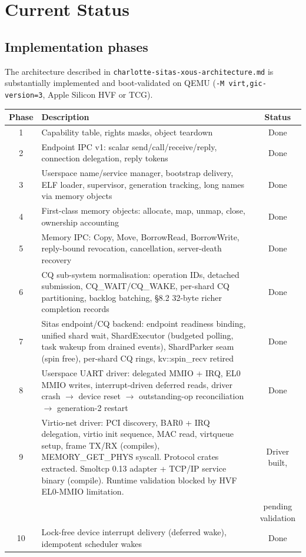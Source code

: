 \chapter{Current Status}

\section{Implementation phases}

The architecture described in \texttt{charlotte-sitas-xous-architecture.md} is
substantially implemented and boot-validated on QEMU (\texttt{-M
virt,gic-version=3}, Apple Silicon HVF or TCG).

\begin{longtable}{|c|p{7cm}|c|}
\hline
\textbf{Phase} & \textbf{Description} & \textbf{Status} \\
\hline
1 & Capability table, rights masks, object teardown & Done \\
2 & Endpoint IPC v1: scalar send/call/receive/reply, connection delegation,
    reply tokens & Done \\
3 & Userspace name/service manager, bootstrap delivery, ELF loader, supervisor,
    generation tracking, long names via memory objects & Done \\
4 & First-class memory objects: allocate, map, unmap, close, ownership
    accounting & Done \\
5 & Memory IPC: Copy, Move, BorrowRead, BorrowWrite, reply-bound revocation,
    cancellation, server-death recovery & Done \\
6 & CQ sub-system normalisation: operation IDs, detached submission,
    CQ\_WAIT/CQ\_WAKE, per-shard CQ partitioning, backlog batching, \S8.2
    32-byte richer completion records & Done \\
7 & Sitas endpoint/CQ backend: endpoint readiness binding, unified shard
    wait, ShardExecutor (budgeted polling, task wakeup from drained events),
    ShardParker seam (spin free), per-shard CQ rings, kv::spin\_recv
    retired & Done \\
8 & Userspace UART driver: delegated MMIO + IRQ, EL0 MMIO writes,
    interrupt-driven deferred reads, driver crash $\rightarrow$ device reset
    $\rightarrow$ outstanding-op reconciliation $\rightarrow$ generation-2
    restart & Done \\
9 & Virtio-net driver: PCI discovery, BAR0 + IRQ delegation, virtio init
    sequence, MAC read, virtqueue setup, frame TX/RX (compiles),
    MEMORY\_GET\_PHYS syscall. Protocol crates extracted. Smoltcp 0.13
    adapter + TCP/IP service binary (compile). Runtime validation blocked by
    HVF EL0-MMIO limitation. & Driver built, \\
    & & pending validation \\
10 & Lock-free device interrupt delivery (deferred wake), idempotent scheduler
    wakes & Done \\
\hline
\end{longtable}

